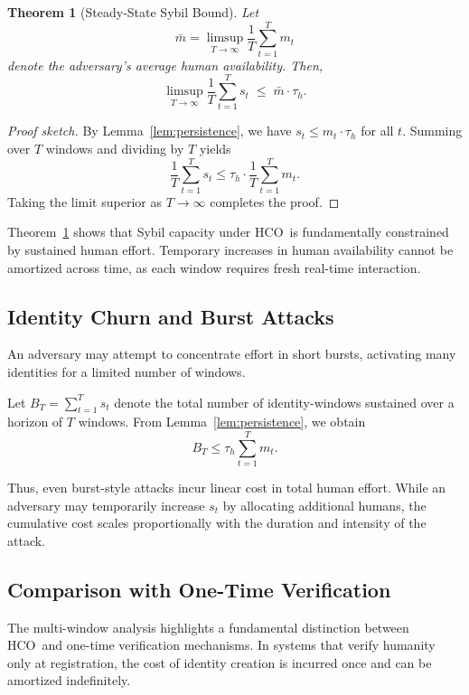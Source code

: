 \documentclass[11pt]{article}
\newcommand{\HCO}{HCO\xspace}
\newtheorem{theorem}{Theorem}
\begin{document}
\begin{theorem}[Steady-State Sybil Bound]
	\label{thm:steady-state}
	Let
	\[
	\bar{m} = \limsup_{T \to \infty} \frac{1}{T} \sum_{t=1}^{T} m_t
	\]
	denote the adversary’s average human availability. Then,
	\[
	\limsup_{T \to \infty} \frac{1}{T} \sum_{t=1}^{T} s_t
	\;\le\; \bar{m} \cdot \tau_h .
	\]
\end{theorem}

\begin{proof}[Proof sketch]
	By Lemma~\ref{lem:persistence}, we have $s_t \le m_t \cdot \tau_h$ for all $t$. Summing over $T$ windows and dividing by $T$ yields
	\[
	\frac{1}{T} \sum_{t=1}^{T} s_t
	\le
	\tau_h \cdot \frac{1}{T} \sum_{t=1}^{T} m_t.
	\]
	Taking the limit superior as $T \to \infty$ completes the proof.
\end{proof}

Theorem~\ref{thm:steady-state} shows that Sybil capacity under \HCO\ is fundamentally constrained by sustained human effort. Temporary increases in human availability cannot be amortized across time, as each window requires fresh real-time interaction.

\subsection{Identity Churn and Burst Attacks}

An adversary may attempt to concentrate effort in short bursts, activating many identities for a limited number of windows.

Let $B_T = \sum_{t=1}^{T} s_t$ denote the total number of identity-windows sustained over a horizon of $T$ windows. From Lemma~\ref{lem:persistence}, we obtain
\[
B_T \le \tau_h \sum_{t=1}^{T} m_t .
\]

Thus, even burst-style attacks incur linear cost in total human effort. While an adversary may temporarily increase $s_t$ by allocating additional humans, the cumulative cost scales proportionally with the duration and intensity of the attack.

\subsection{Comparison with One-Time Verification}

The multi-window analysis highlights a fundamental distinction between \HCO\ and one-time verification mechanisms. In systems that verify humanity only at registration, the cost of identity creation is incurred once and can be amortized indefinitely.
\end{document}
